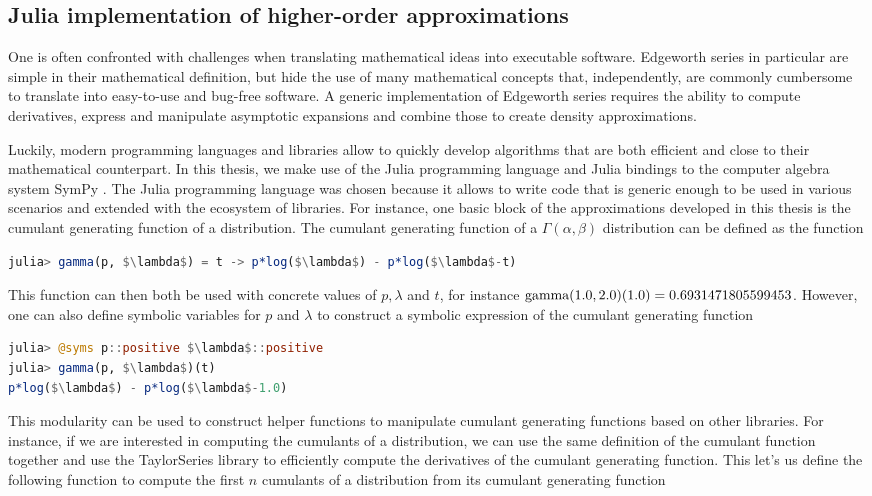 \subsection{Julia implementation of higher-order approximations}
One is often confronted with challenges when translating mathematical ideas into executable software. Edgeworth series in particular are simple in their mathematical definition, but hide the use of many mathematical concepts that, independently, are commonly cumbersome to translate into easy-to-use and bug-free software. A generic implementation of Edgeworth series requires the ability to compute derivatives, express and manipulate asymptotic expansions and combine those to create density approximations.

Luckily, modern programming languages and libraries allow to quickly develop algorithms that are both efficient and close to their mathematical counterpart. In this thesis, we make use of the Julia programming language \cite{bezanson2017julia} and Julia bindings to the computer algebra system SymPy \cite{sympy}. The Julia programming language was chosen because it allows to write code that is generic enough to be used in various scenarios and extended with the ecosystem of libraries. For instance, one basic block of the approximations developed in this thesis is the cumulant generating function of a distribution. The cumulant generating function of a $\Gamma(\alpha, \beta)$ distribution can be defined as the function
\begin{lstlisting}[language=Julia, mathescape, escapechar=\%]
julia> gamma(p, $\lambda$) = t -> p*log($\lambda$) - p*log($\lambda$-t)
\end{lstlisting}
This function can then both be used with concrete values of $p, \lambda$ and $t$, for instance ${\textrm{gamma}}(1.0, 2.0)(1.0) = 0.6931471805599453$. However, one can also define symbolic variables for $p$ and $\lambda$ to construct a symbolic expression of the cumulant generating function
\begin{lstlisting}[language=Julia, mathescape, escapechar=\%]
julia> @syms p::positive $\lambda$::positive
julia> gamma(p, $\lambda$)(t)
p*log($\lambda$) - p*log($\lambda$-1.0)
\end{lstlisting}
This modularity can be used to construct helper functions to manipulate cumulant generating functions based on other libraries. For instance, if we are interested in computing the cumulants of a distribution, we can use the same definition of the cumulant function together and use the TaylorSeries \cite{TaylorSeries} library to efficiently compute the derivatives of the cumulant generating function. This let's us define the following function to compute the first $n$ cumulants of a distribution from its cumulant generating function
